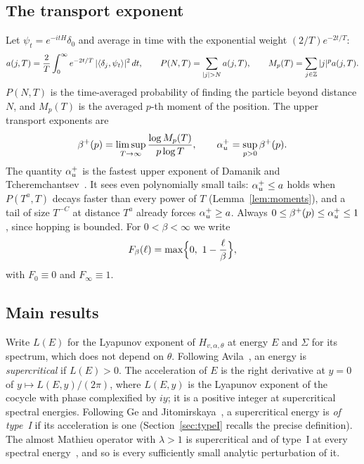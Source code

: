 \subsection{The transport exponent}

Let $\psi_t=e^{-itH}\delta_0$ and average in time with the exponential weight $(2/T)e^{-2t/T}$:
\begin{equation}\label{eq:abel}
a(j,T)=\frac2T\int_0^\infty e^{-2t/T}\,|\langle\delta_j,\psi_t\rangle|^2\,dt,\qquad
P(N,T)=\sum_{|j|>N}a(j,T),\qquad M_p(T)=\sum_{j\in\Z}|j|^p a(j,T).
\end{equation}
$P(N,T)$ is the time-averaged probability of finding the particle beyond distance $N$, and $M_p(T)$ is the averaged $p$-th moment of the position. The upper transport exponents are
\begin{equation}\label{eq:exponents}
\beta^+(p)=\limsup_{T\to\infty}\frac{\log M_p(T)}{p\log T},\qquad
\alpha_u^+=\sup_{p>0}\beta^+(p).
\end{equation}
The quantity $\alpha_u^+$ is the fastest upper exponent of Damanik and Tcheremchantsev~\cite{DT2007}. It sees even polynomially small tails: $\alpha_u^+\le a$ holds when $P(T^a,T)$ decays faster than every power of $T$ (Lemma~\ref{lem:moments}), and a tail of size $T^{-C}$ at distance $T^{a}$ already forces $\alpha_u^+\ge a$. Always $0\le\beta^+(p)\le\alpha_u^+\le1$, since hopping is bounded. For $0<\beta<\infty$ we write
\[
F_\beta(\ell)=\max\Bigl\{0,\ 1-\frac{\ell}{\beta}\Bigr\},
\]
with $F_0\equiv0$ and $F_\infty\equiv1$.

\subsection{Main results}

Write $L(E)$ for the Lyapunov exponent of $H_{v,\alpha,\theta}$ at energy $E$ and $\Sigma$ for its spectrum, which does not depend on $\theta$. Following Avila~\cite{Avila2015}, an energy is \emph{supercritical} if $L(E)>0$. The acceleration of $E$ is the right derivative at $y=0$ of $y\mapsto L(E,y)/(2\pi)$, where $L(E,y)$ is the Lyapunov exponent of the cocycle with phase complexified by $iy$; it is a positive integer at supercritical spectral energies. Following Ge and Jitomirskaya~\cite{GeJitomirskaya2024}, a supercritical energy is \emph{of type~I} if its acceleration is one (Section~\ref{sec:typeI} recalls the precise definition). The almost Mathieu operator with $\lambda>1$ is supercritical and of type~I at every spectral energy~\cite{Avila2015}, and so is every sufficiently small analytic perturbation of it.

